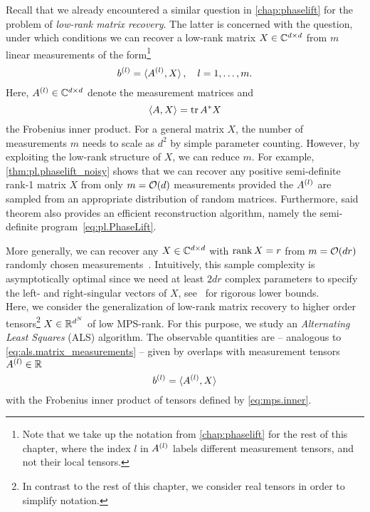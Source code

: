 Recall that we already encountered a similar question in \cref{chap:phaselift} for the problem of \emph{low-rank matrix recovery}.
The latter is concerned with the question, under which conditions we can recover a low-rank matrix $X \in {\mathbb{C}}^{d \times d}$ from $m$ linear measurements of the form\footnote{%
  Note that we take up the notation from \cref{chap:phaselift} for the rest of this chapter, where the index $l$ in $A^{(l)}$ labels different measurement tensors, and not their local tensors.
}
\[
  b^{(l)} = \braket{A^{(l)}, X}, \quad l=1, \ldots, m.
  \label{eq:als.matrix_measurements}
\]
Here, $A^{(l)} \in {\mathbb{C}}^{d \times d}$ denote the measurement matrices and
\[
  \braket{A, X} = \operatorname{tr} {{A}^\ast} X
\]
the Frobenius inner product.
For a general matrix $X$, the number of measurements $m$ needs to scale as $d^2$ by simple parameter counting.
However, by exploiting the low-rank structure of $X$, we can reduce $m$.
For example, \cref{thm:pl.phaselift_noisy} shows that we can recover any positive semi-definite rank-1 matrix $X$ from only $m = {\mathcal{O}}(d)$ measurements provided the $A^{(l)}$ are sampled from an appropriate distribution of random matrices.
Furthermore, said theorem also provides an efficient reconstruction algorithm, namely the semi-definite program~\eqref{eq:pl.PhaseLift}.

More generally, we can recover any $X \in {\mathbb{C}}^{d \times d}$ with $\operatorname{rank} X = r$ from $m = {\mathcal{O}}(d r)$ randomly chosen measurements~\cite{Candes_2011_Tight,Kueng_2014_Low}.
Intuitively, this sample complexity is asymptotically optimal since we need at least $2 d r$ complex parameters to specify the left- and right-singular vectors of $X$, see~\cite{Eldar_2012_Uniqueness,Li_2017_Optimal} for rigorous lower bounds.\\




Here, we consider the generalization of low-rank matrix recovery to higher order tensors\footnote{%
  In contrast to the rest of this chapter, we consider real tensors in order to simplify notation.
}
$X \in {\mathbb{R}}^{d^N}$ of low MPS-rank.
For this purpose, we study an \emph{Alternating Least Squares} (ALS) algorithm.
The observable quantities are -- analogous to \cref{eq:als.matrix_measurements} -- given by overlaps with measurement tensors $A^{(l)} \in {\mathbb{R}}$
\[
  b^{(l)} = \braket{A^{(l)}, X}
  \label{eq:als.tensor_measurements}
\]
with the Frobenius inner product of tensors defined by \cref{eq:mps.inner}.

